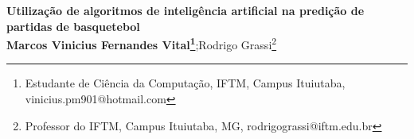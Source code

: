 \thispagestyle{empty}
\begin{center}
\textbf{Utilização de algoritmos de inteligência artificial na predição de partidas de basquetebol \\
Marcos Vinicius Fernandes Vital\footnote[1]{Estudante de Ciência da Computação, IFTM, Campus Ituiutaba, vinicius.pm901@hotmail.com}};Rodrigo Grassi\footnote[2]{Professor do IFTM, Campus Ituiutaba, MG, rodrigograssi@iftm.edu.br}
\end{center}